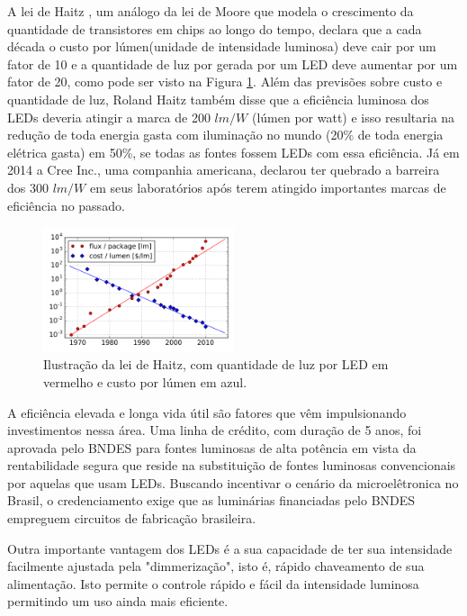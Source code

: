 A lei de Haitz \cite{haitz}, um análogo da lei de Moore que modela o crescimento da quantidade de transistores em chips ao longo do tempo, declara que a cada década o custo por lúmen(unidade de intensidade luminosa) deve cair por um fator de 10 e a quantidade de luz por gerada por um LED deve aumentar por um fator de 20, como pode ser visto na Figura \ref{fig:haitz}. Além das previsões sobre custo e quantidade de luz, Roland Haitz também disse que a eficiência luminosa dos LEDs deveria atingir a marca de 200 $lm/W$ (lúmen por watt) e isso resultaria na redução de toda energia gasta com iluminação no mundo (20\% de toda energia elétrica gasta) em 50\%, se todas as fontes fossem LEDs com essa eficiência. Já em 2014 a Cree Inc., uma companhia americana, declarou ter quebrado a barreira dos 300 $lm/W$ \cite{cree} em seus laboratórios após terem atingido importantes marcas de eficiência no passado.

\begin{figure}[ht]
    \begin{center}
    \includegraphics[width=0.5\textwidth]{figuras/haitz.png}
    \end{center}
    \caption{Ilustração da lei de Haitz, com quantidade de luz por LED em vermelho e custo por lúmen em azul.}
    \label{fig:haitz}
\end{figure}

A eficiência elevada e longa vida útil são fatores que vêm impulsionando investimentos nessa área. Uma linha de crédito, com duração de 5 anos, foi aprovada pelo BNDES \cite{bndes2} para fontes luminosas de alta potência em vista da rentabilidade segura que reside na substituição de fontes luminosas convencionais por aquelas que usam LEDs. Buscando incentivar o cenário da microelêtronica no Brasil, o credenciamento exige que as luminárias financiadas pelo BNDES empreguem circuitos de fabricação brasileira.

Outra importante vantagem dos LEDs é a sua capacidade de ter sua intensidade facilmente ajustada pela "dimmerização", isto é, rápido chaveamento de sua alimentação. Isto permite o controle rápido e fácil da intensidade luminosa permitindo um uso ainda mais eficiente.

